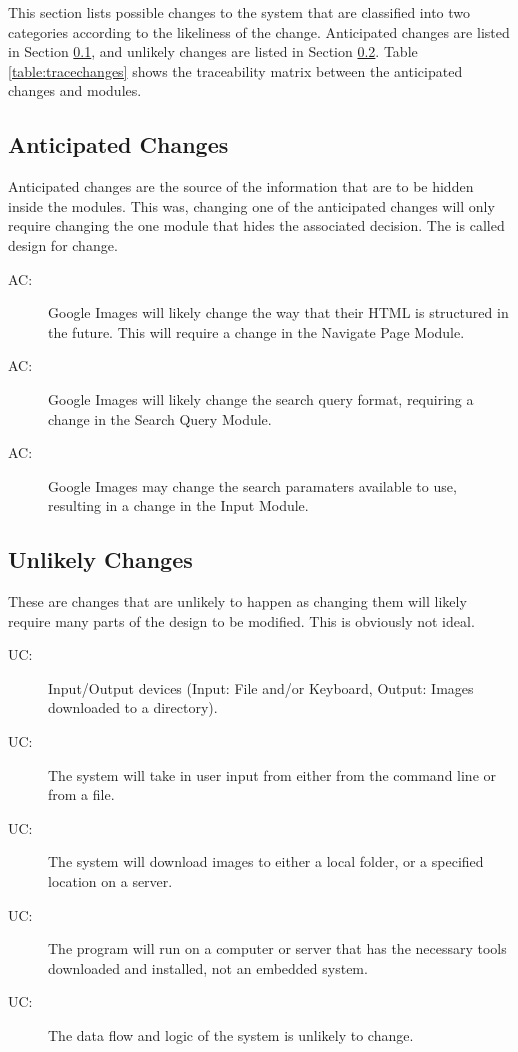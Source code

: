 \documentclass[12pt, titlepage]{article}
\newcounter{acnum}
\newcommand{\actheacnum}{AC\theacnum}
\newcounter{ucnum}
\newcommand{\uctheucnum}{UC\theucnum}
\begin{document}
This section lists possible changes to the system that are classified into two
categories according to the likeliness of the change. Anticipated changes are 
listed in Section \ref{SecAchange}, and unlikely changes are listed in Section \ref{SecUchange}.
Table \ref{table:tracechanges} shows the traceability matrix between the anticipated changes and modules.

\subsection{Anticipated Changes} \label{SecAchange}

Anticipated changes are the source of the information that are to be hidden
inside the modules. This was, changing one of the anticipated changes will only
require changing the one module that hides the associated decision. The is called design for change.

\begin{description}
\item[ \actheacnum \label{acHTMLStructure}:] Google Images will likely change the way that their HTML is structured in the future.
This will require a change in the Navigate Page Module.
\item[ \actheacnum \label{acQueryFormat}:] Google Images will likely change the search query format, requiring a change 
in the Search Query Module.
\item[ \actheacnum \label{acInputParam}:] Google Images may change the search paramaters available to use, resulting 
in a change in the Input Module.
\end{description}

\subsection{Unlikely Changes} \label{SecUchange}

These are changes that are unlikely to happen as changing them will likely require many parts of the design to 
be modified. This is obviously not ideal.

\begin{description}
\item[ \uctheucnum \label{ucIO}:] Input/Output devices
  (Input: File and/or Keyboard, Output: Images downloaded to a directory).
\item[ \uctheucnum \label{ucInput}:] The system will take in user input from either from the command line or from a file.
\item[ \uctheucnum \label{ucOutput}:] The system will download images to either a local folder, or a specified
location on a server.
\item[ \uctheucnum \label{ucOutput}:] The program will run on a computer or server that has the necessary tools 
downloaded and installed, not an embedded system.
\item[ \uctheucnum \label{ucFlow}:] The data flow and logic of the system is unlikely to change.
\end{description}
\end{document}
